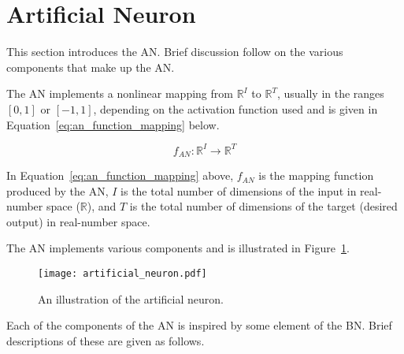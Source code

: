 \section{Artificial Neuron}\label{sec:anns:an}

This section introduces the \acs{AN}. Brief discussion follow on the various components that make up the \acs{AN}.

The \acs{AN} implements a nonlinear mapping from $\mathbb{R}^{I}$ to
$\mathbb{R}^{T}$, usually in the ranges $[0,1]$ or $[-1,1]$, depending on the
activation function used \cite{ref:engelbrecht:2007} and is given
in Equation~\eqref{eq:an_function_mapping} below.

\begin{equation}
    f_{AN} \colon \mathbb{R}^{I} \to \mathbb{R}^{T}
    \label{eq:an_function_mapping}
\end{equation}

\noindent
In Equation~\eqref{eq:an_function_mapping} above, $f_{AN}$ is the mapping function produced by the \acs{AN}, $I$ is the total number of dimensions of the input in real-number space ($\mathbb{R}$), and $T$ is the total number of dimensions of the target (desired output) in real-number space.

The \acs{AN} implements various components and is illustrated in Figure~\ref{fig:artificial_neuron}.

\begin{figure}[htpb]
    \centering
    \texttt{[image: artificial\_neuron.pdf]}
    \caption[The artificial neuron]{An illustration of the artificial neuron.}
    \label{fig:artificial_neuron}
\end{figure}

\noindent
Each of the components of the \acs{AN} is inspired by some element of the \acs{BN}. Brief descriptions of these are given as follows.


